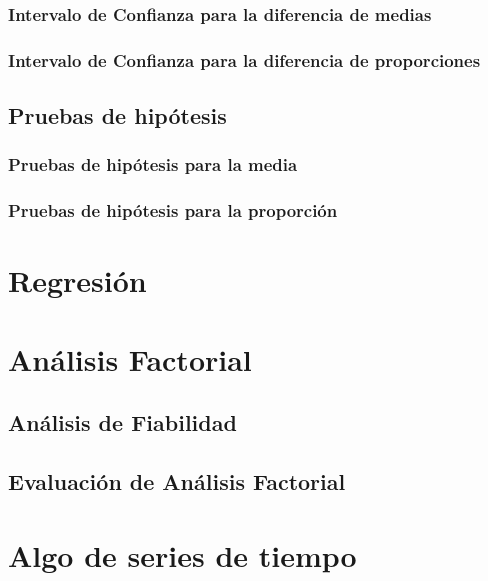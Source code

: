\documentclass[]{book}
\begin{document}
\subsection{Intervalo de Confianza para la diferencia de
medias}\label{intervalo-de-confianza-para-la-diferencia-de-medias}

\subsection{Intervalo de Confianza para la diferencia de
proporciones}\label{intervalo-de-confianza-para-la-diferencia-de-proporciones}

\section{Pruebas de hipótesis}\label{ph}

\subsection{Pruebas de hipótesis para la
media}\label{pruebas-de-hipotesis-para-la-media}

\subsection{Pruebas de hipótesis para la
proporción}\label{pruebas-de-hipotesis-para-la-proporcion}

\chapter{Regresión}\label{methods}

\chapter{Análisis Factorial}\label{analisis-factorial}

\section{Análisis de Fiabilidad}\label{analisis-de-fiabilidad}

\section{Evaluación de Análisis
Factorial}\label{evaluacion-de-analisis-factorial}

\chapter{Algo de series de tiempo}\label{algo-de-series-de-tiempo}


\end{document}
